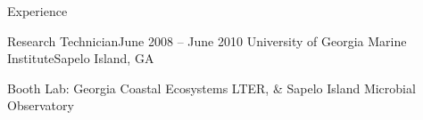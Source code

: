 \documentclass{resume} %
\begin{document}
\begin{rSection}{Experience}
  \begin{rSubsection}{Research Technician}{June 2008 -- June 2010}
    {University of Georgia Marine Institute}{Sapelo Island, GA}
    \item Booth Lab: Georgia Coastal Ecosystems LTER, \& Sapelo Island Microbial
                     Observatory
  \end{rSubsection}



\end{rSection}

\end{document}
